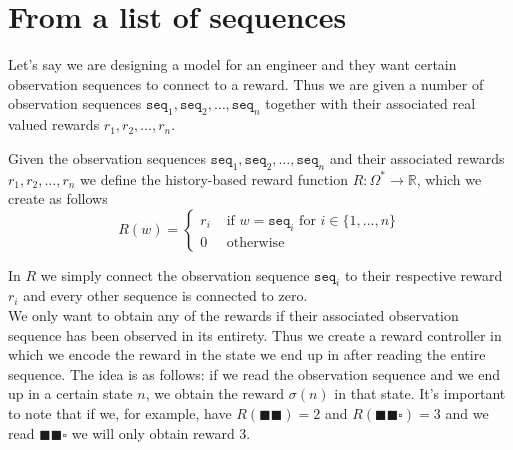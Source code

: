 \section{From a list of sequences}
\label{sec:rc-sequences}
Let's say we are designing a model for an engineer and they want certain observation sequences to connect to a reward. Thus we are given a number of observation sequences $\texttt{seq}_1,\texttt{seq}_2,\dots,\texttt{seq}_n$ together with their associated real valued rewards $r_1,r_2,\dots,r_n$.
\begin{definition}
Given the observation sequences $\texttt{seq}_1,\texttt{seq}_2,\dots,\texttt{seq}_n$ and their associated rewards $r_1,r_2,\dots,r_n$ we define the history-based reward function $R:\Omega^*\to\mathbb{R}$, which we create as follows
\[R(w) = \begin{cases}
	r_i &\text{ if } w=\texttt{seq}_i \text { for } i\in \{1,\dots,n\} \\
	0   &\text{ otherwise}
	\end{cases}\]
	\label{d:created_reward_function}
\end{definition}
In $R$ we simply connect the observation sequence $\texttt{seq}_i$ to their respective reward $r_i$ and every other sequence is connected to zero.\\

We only want to obtain any of the rewards if their associated observation sequence has been observed in its entirety. Thus we create a reward controller in which we encode the reward in the state we end up in after reading the entire sequence. The idea is as follows: if we read the observation sequence and we end up in a certain state $n$, we obtain the reward $\sigma(n)$ in that state. It's important to note that if we, for example, have $R(\blacksquare\blacksquare)=2$ and $R(\blacksquare\blacksquare\square)=3$ and we read $\blacksquare\blacksquare\square$ we will only obtain reward $3$. 

